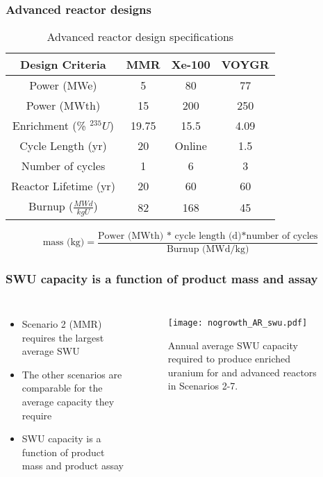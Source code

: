 \begin{frame}
    \frametitle{Advanced reactor designs}
    \begingroup
        \renewcommand{\arraystretch}{1.5}
        \begin{table}
            \small
            \caption{Advanced reactor design specifications}
            \label{tab:reactor_summary}
            \begin{tabular}{ c c c c }
                \hline
                Design Criteria & MMR 
                    \cite{noauthor_usnc_2021} & 
                    Xe-100 \cite{mulder_overview_2021} & 
                    VOYGR \cite{nuscale_chapter_2020-1,reyes_nuscale_2021,reyes_correction_2022}\\\hline
                Power (MWe) & 5 & 80 & 77\\
                Power (MWth) & 15 & 200 & 250\\
                Enrichment (\% $^{235}U$) & 19.75 & 15.5 & 4.09 \\
                Cycle Length (yr) & 20 & Online & 1.5 \\
                Number of cycles & 1 & 6 & 3\\
                Reactor Lifetime (yr) & 20 & 60 & 60\\
                Burnup ($\frac{MWd}{kg U}$) & 82 & 168 & 45\\
                \hline
            \end{tabular}
        \end{table}   
    \endgroup
    \begin{equation*}
        \text{mass (kg)} = \frac{\text{Power (MWth) * cycle length (d)*number of cycles}}{\text{Burnup (MWd/kg)}}
        \label{eq:fuel_mass}
    \end{equation*}
\end{frame}

\begin{frame}
    \frametitle{\gls{SWU} capacity is a function of product mass and assay}
    \begin{columns}
        \column[t]{4.3cm}
            \begin{itemize}
                \item Scenario 2 (MMR) requires the largest average \gls{SWU} 
                \item The other scenarios are comparable for the average 
                      capacity they require
                \item \gls{SWU} capacity is a function of product mass and 
                      product assay
                
            \end{itemize}
        \column[t]{6.3cm}
        \vspace{-1cm}
        \begin{figure}
                \centering
                \texttt{[image: nogrowth\_AR\_swu.pdf]}
                \caption{Annual average \gls{SWU} capacity required to produce 
                enriched uranium for and advanced reactors in Scenarios 2-7.}
                \label{fig:ot_swu}
        \end{figure}
    \end{columns}
\end{frame}
